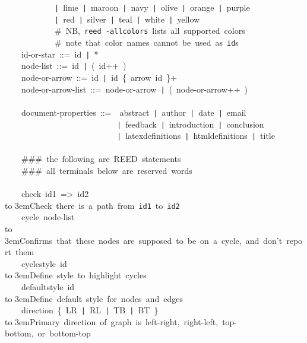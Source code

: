 {\hbox{}~~~~~~~~~~~~\texttt{|}~lime~\texttt{|}~maroon~\texttt{|}~navy~\texttt{|}~olive~\texttt{|}~orange~\texttt{|}~purple\\
\hbox{}~~~~~~~~~~~~\texttt{|}~red~\texttt{|}~silver~\texttt{|}~teal~\texttt{|}~white~\texttt{|}~yellow\\
\hbox{}~~~~~~~~~~~~{\rm \#~NB,~\texttt{reed~-allcolors}~lists~all~supported~colors}\\
\hbox{}~~~~~~~~~~~~{\rm \#~note~that~color~names~cannot~be~used~as~\texttt{id}s}\\
\hbox{}~~~~id-or-star~::=~id~\texttt{|}~*\\
\hbox{}~~~~node-list~::=~id~\texttt{|}~(~id++~)\\
\hbox{}~~~~node-or-arrow~::=~id~\texttt{|}~id~\{~arrow~id~\}+\\
\hbox{}~~~~node-or-arrow-list~::=~node-or-arrow~\texttt{|}~(~node-or-arrow++~)\\
\hbox{}\\
\hbox{}~~~~document-properties~::=~~abstract~\texttt{|}~author~\texttt{|}~date~\texttt{|}~email\\
\hbox{}~~~~~~~~~~~~~~~~~~~~~~~~~~~\texttt{|}~feedback~\texttt{|}~introduction~\texttt{|}~conclusion~\\
\hbox{}~~~~~~~~~~~~~~~~~~~~~~~~~~~\texttt{|}~latexdefinitions~\texttt{|}~htmldefinitions~\texttt{|}~title~\\
\hbox{}\\
\hbox{}~~~~{\rm \#\#\#~the~following~are~REED~statements}\\
\hbox{}~~~~{\rm \#\#\#~all~terminals~below~are~reserved~words}\\
\hbox{}\\
\hbox{}~~~~check~id1~=>~id2\\
\hbox to 3em{}{\rm Check~there~is~a~path~from~\texttt{id1}~to~\texttt{id2}}\\
\hbox{}~~~~cycle~node-list\\
\hbox to 3em{}{\rm Confirms~that~these~nodes~are~supposed~to~be~on~a~cycle,~and~don't~report~them}\\
\hbox{}~~~~cyclestyle~id\\
\hbox to 3em{}{\rm Define~style~to~highlight~cycles}\\
\hbox{}~~~~defaultstyle~id\\
\hbox to 3em{}{\rm Define~default~style~for~nodes~and~edges}\\
\hbox{}~~~~direction~\{~LR~\texttt{|}~RL~\texttt{|}~TB~\texttt{|}~BT~\}\\
\hbox to 3em{}{\rm Primary~direction~of~graph~is~left-right,~right-left,~top-bottom,~or~bottom-top}\\
}
